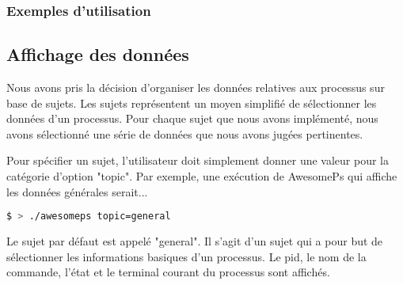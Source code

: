 \subsubsection{Exemples d'utilisation}

\subsection{Affichage des données}
Nous avons pris la décision d'organiser les données relatives aux processus sur base de sujets. Les sujets représentent un moyen simplifié de sélectionner les données d'un processus. Pour chaque sujet que nous avons implémenté, nous avons sélectionné une série de données que nous avons jugées pertinentes.

Pour spécifier un sujet, l'utilisateur doit simplement donner une valeur pour la catégorie d'option "topic". Par exemple, une exécution de AwesomePs qui affiche les données générales serait...

\begin{lstlisting}[frame=single, language=bash]
$ > ./awesomeps topic=general
\end{lstlisting}

Le sujet par défaut est appelé "general". Il s'agit d'un sujet qui a pour but de sélectionner les informations basiques d'un processus. Le pid, le nom de la commande, l'état et le terminal courant du processus sont affichés.

